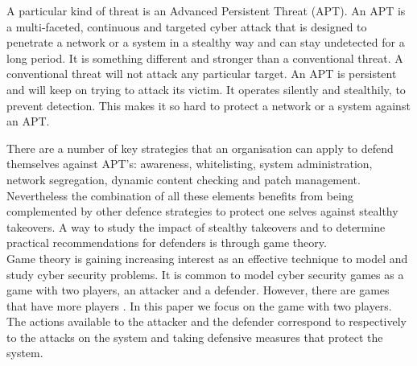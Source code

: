 A particular kind of threat is an Advanced Persistent Threat (APT). An APT is a multi-faceted, continuous and targeted cyber attack that is designed to penetrate a network or a system in a stealthy way and can stay undetected for a long period. It is something different and stronger than a conventional threat. A conventional threat will not attack any particular target. An APT is persistent and will keep on trying to attack its victim. It operates silently and stealthily, to prevent detection. This makes it so hard to protect a network or a system against an APT. 



There are a number of key strategies that an organisation can apply to defend themselves against APT's: awareness, whitelisting, system administration, network segregation, dynamic content checking and patch management. Nevertheless the combination of all these elements benefits from being complemented by other defence strategies to protect one selves against stealthy takeovers. A way to study the impact of stealthy takeovers and to determine practical recommendations for defenders is through game theory.\\
Game theory is gaining increasing interest as an effective technique to model and study cyber security problems. It is common to model cyber security games as a game with two players, an attacker and a defender. However, there are games that have more players \cite{fengstealthy}. In this paper we focus on the game with two players. The actions available to the attacker and the defender correspond to respectively to the attacks on the system and taking defensive measures that protect the system. \\

